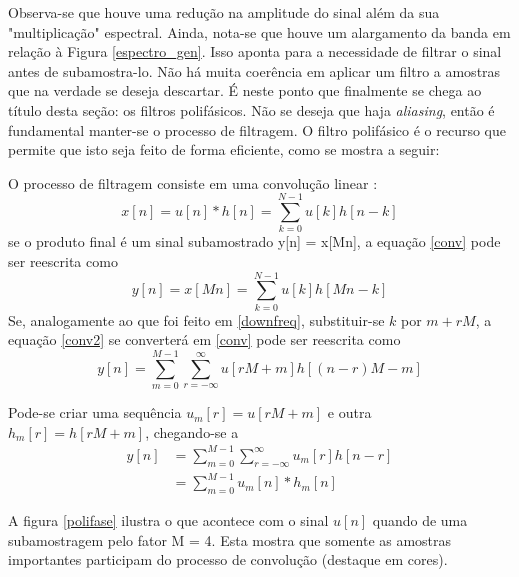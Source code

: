 \par Observa-se que houve uma redução na amplitude do sinal além da sua "multiplicação" espectral. Ainda, nota-se que houve um alargamento da banda em relação à Figura \ref{espectro_gen}. Isso aponta para a necessidade de filtrar o sinal antes de subamostra-lo. Não há muita coerência em aplicar um filtro a amostras que na verdade se deseja descartar. É neste ponto que finalmente se chega ao título desta seção: os filtros polifásicos. Não se deseja que haja \textit{aliasing}, então é fundamental manter-se o processo de filtragem. O filtro polifásico é o recurso que permite que isto seja feito de forma eficiente, como se mostra a seguir: 
\par O processo de filtragem consiste em uma convolução linear \cite{Krishna}: 
\begin{equation}\label{conv}
x[n] = u[n]\ast h[n] = \sum_{k=0}^{N-1} u[k]h[n-k]
\end{equation}
se o produto final é um sinal subamostrado y[n] = x[Mn], a equação \ref{conv} pode ser reescrita como \cite{Krishna}
\begin{equation}\label{conv2}
y[n] = x[Mn] = \sum_{k=0}^{N-1} u[k]h[Mn-k]
\end{equation}
Se, analogamente ao que foi feito em \ref{downfreq}, substituir-se $k$ por $m + rM$, a equação \ref{conv2} se converterá em
\ref{conv} pode ser reescrita como \cite{Krishna}
\begin{equation}\label{conv3}
y[n] = \sum_{m=0}^{M-1}\sum_{r=-\infty}^{\infty} u[rM+m]h[(n-r)M-m]
\end{equation}
\par Pode-se criar uma sequência $u_{m}[r] = u[rM + m]$ e outra $h_{m}[r] = h[rM+m]$, chegando-se a \cite{Krishna}
\begin{equation}\label{conv4}
\begin{split}
y[n] &= \sum_{m=0}^{M-1}\sum_{r=-\infty}^{\infty} u_{m}[r]h[n-r] \\
     &= \sum_{m=0}^{M-1}u_{m}[n]\ast h_{m}[n]
\end{split}
\end{equation}

\par A figura \ref{polifase} ilustra o que acontece com o sinal $u[n]$ quando de uma subamostragem pelo fator M = 4. Esta mostra que somente as amostras importantes participam do processo de convolução (destaque em cores). 

